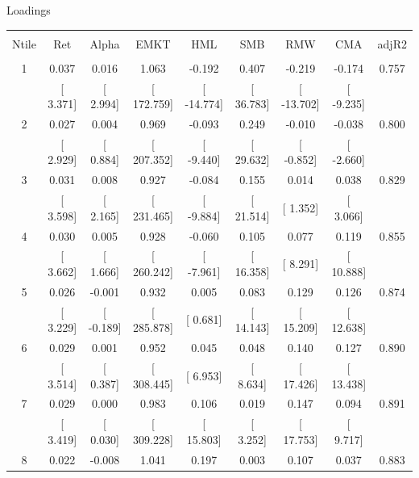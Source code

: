 \documentclass{beamer}
\begin{document}
\begin{frame}{Loadings}

\vspace{-0.64cm}

\begin{table}[!htbp] \centering 
  \scriptsize
\begin{tabular}{@{\extracolsep{-3pt}} ccccccccc} 
\\[-1.8ex]\hline 
\hline \\[-1.8ex] 
Ntile & Ret & Alpha & EMKT & HML & SMB & RMW & CMA & adjR2 \\ 
\hline \\[-1.8ex] 
1 & 0.037 & 0.016 & 1.063 & -0.192 & 0.407 & -0.219 & -0.174 & 0.757 \\ 
 & [ 3.371] & [ 2.994] & [ 172.759] & [ -14.774] & [ 36.783] & [ -13.702] & [ -9.235] &  \\ 
2 & 0.027 & 0.004 & 0.969 & -0.093 & 0.249 & -0.010 & -0.038 & 0.800 \\ 
 & [ 2.929] & [ 0.884] & [ 207.352] & [ -9.440] & [ 29.632] & [ -0.852] & [ -2.660] &  \\ 
3 & 0.031 & 0.008 & 0.927 & -0.084 & 0.155 & 0.014 & 0.038 & 0.829 \\ 
 & [ 3.598] & [ 2.165] & [ 231.465] & [ -9.884] & [ 21.514] & [ 1.352] & [ 3.066] &  \\ 
4 & 0.030 & 0.005 & 0.928 & -0.060 & 0.105 & 0.077 & 0.119 & 0.855 \\ 
 & [ 3.662] & [ 1.666] & [ 260.242] & [ -7.961] & [ 16.358] & [ 8.291] & [ 10.888] &  \\ 
5 & 0.026 & -0.001 & 0.932 & 0.005 & 0.083 & 0.129 & 0.126 & 0.874 \\ 
 & [ 3.229] & [ -0.189] & [ 285.878] & [ 0.681] & [ 14.143] & [ 15.209] & [ 12.638] &  \\ 
6 & 0.029 & 0.001 & 0.952 & 0.045 & 0.048 & 0.140 & 0.127 & 0.890 \\ 
 & [ 3.514] & [ 0.387] & [ 308.445] & [ 6.953] & [ 8.634] & [ 17.426] & [ 13.438] &  \\ 
7 & 0.029 & 0.000 & 0.983 & 0.106 & 0.019 & 0.147 & 0.094 & 0.891 \\ 
 & [ 3.419] & [ 0.030] & [ 309.228] & [ 15.803] & [ 3.252] & [ 17.753] & [ 9.717] &  \\ 
8 & 0.022 & -0.008 & 1.041 & 0.197 & 0.003 & 0.107 & 0.037 & 0.883 \\ 

\end{tabular}
\end{table}
\end{frame}
\end{document}

